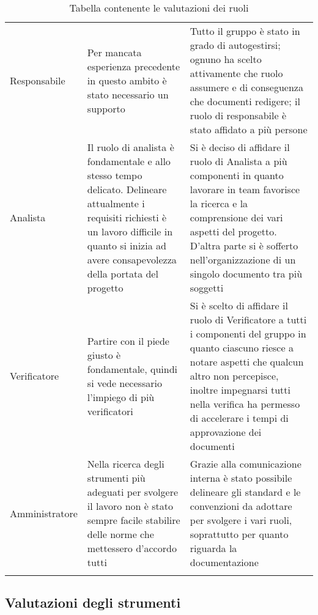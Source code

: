 \documentclass[../piano_di_qualifica.tex]{subfiles}
\begin{document}
\begin{center}
\begin{longtable}{|p{2.5cm}|p{7cm}|p{7cm}|}
		Responsabile   & Per mancata esperienza precedente in questo ambito è stato necessario un supporto                                                                                                                          & Tutto il gruppo è stato in grado di autogestirsi; ognuno ha scelto attivamente che ruolo assumere e di conseguenza che documenti redigere; il ruolo di responsabile è stato affidato a più persone                                                                    \\
		Analista       & Il ruolo di analista è fondamentale e allo stesso tempo delicato. Delineare attualmente i requisiti richiesti è un lavoro difficile in quanto si inizia ad avere consapevolezza della portata del progetto & Si è deciso di affidare il ruolo di Analista a più componenti in quanto lavorare in team favorisce la ricerca e la comprensione dei vari aspetti del progetto. D'altra parte si è sofferto nell'organizzazione di un singolo documento tra più soggetti               \\
		Verificatore   & Partire con il piede giusto è fondamentale, quindi si vede necessario l'impiego di più verificatori                                                                                                        & Si è scelto di affidare il ruolo di Verificatore a tutti i componenti del gruppo in quanto ciascuno riesce a notare aspetti che qualcun altro non percepisce, inoltre impegnarsi tutti nella verifica ha permesso di accelerare i tempi di approvazione dei documenti \\
		Amministratore & Nella ricerca degli strumenti più adeguati per svolgere il lavoro non è stato sempre facile stabilire delle norme che mettessero d'accordo tutti                                                           & Grazie alla comunicazione interna è stato possibile delineare gli standard e le convenzioni da adottare per svolgere i vari ruoli, soprattutto per quanto riguarda la documentazione                                                                                  \\
		\hline
		\rowcolor{white}
		\caption{Tabella contenente le valutazioni dei ruoli }
	\end{longtable}
\end{center}

\subsection{Valutazioni degli strumenti}
\label{sub:valut_strumenti}
\end{document}
